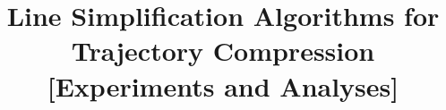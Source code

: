 \documentclass[acmsmall]{acmart}
\begin{document}
\title{Line Simplification Algorithms for Trajectory Compression [Experiments and Analyses]}


%
%
%
%
%




\end{document}

